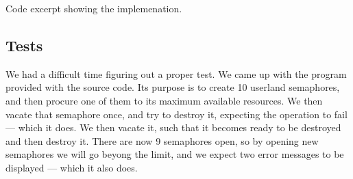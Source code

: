 {Code excerpt showing the  implemenation.}

\subsection{Tests}
We had a difficult time figuring out a proper test. We came up with the
program  provided with the source code. Its purpose is
to create 10 userland semaphores, and then procure one of them to its maximum
available resources. We then vacate that semaphore once, and try to destroy
it, expecting the operation to fail --- which it does. We then vacate it, such
that it becomes ready to be destroyed and then destroy it. There are now 9
semaphores open, so by opening  new
semaphores we will go beyong the limit, and we expect two error messages to be
displayed --- which it also does.

